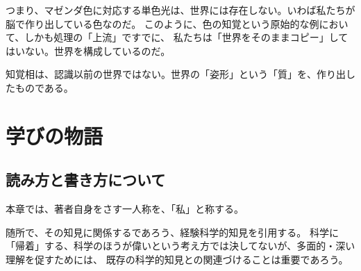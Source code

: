 つまり、マゼンダ色に対応する単色光は、世界には存在しない。いわば私たちが脳で作り出している色なのだ。
このように、色の知覚という原始的な例において、しかも処理の「上流」ですでに、
私たちは「世界をそのままコピー」してはいない。世界を構成しているのだ。

知覚相は、認識以前の世界ではない。世界の「姿形」という「質」を、作り出したものである。



\chapter{学びの物語}

\section{読み方と書き方について}
本章では、著者自身をさす一人称を、「私」と称する。

随所で、その知見に関係するであろう、経験科学的知見を引用する。
科学に「帰着」する、科学のほうが偉いという考え方では決してないが、多面的・深い理解を促すためには、
既存の科学的知見との関連づけることは重要であろう。